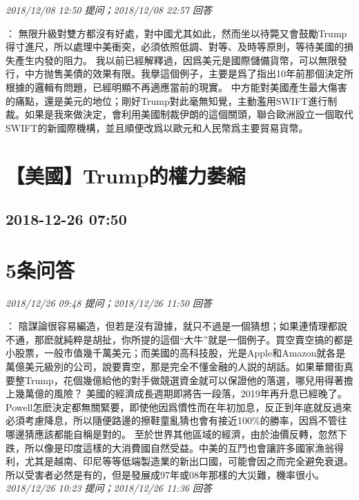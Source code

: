 \documentclass[twocolumn]{ctexart}
\begin{document}
\textit{\hfill\noindent\small 2018/12/08 12:50 提问；2018/12/08 22:57 回答}

：
無限升級對雙方都沒有好處，對中國尤其如此，然而坐以待斃又會鼓勵Trump得寸進尺，所以處理中美衝突，必須依照低調、對等、及時等原則，等待美國的損失產生内發的阻力。
我以前已經解釋過，因爲美元是國際儲備貨幣，可以無限發行，中方抛售美債的效果有限。我擧這個例子，主要是爲了指出10年前那個決定所根據的邏輯有問題，已經明顯不再適應當前的現實。
中方能對美國產生最大傷害的痛點，還是美元的地位；剛好Trump對此毫無知覺，主動濫用SWIFT進行制裁。如果是我來做決定，會利用美國制裁伊朗的這個關頭，聯合歐洲設立一個取代SWIFT的新國際機構，並且順便改爲以歐元和人民幣爲主要貿易貨幣。
\\


\section{【美國】Trump的權力萎縮}
\subsection{2018-12-26 07:50}


\section{5条问答}

\textit{\hfill\noindent\small 2018/12/26 09:48 提问；2018/12/26 11:50 回答}

：
陰謀論很容易編造，但若是沒有證據，就只不過是一個猜想；如果連情理都說不通，那麽就純粹是胡扯，你所提的這個“大牛”就是一個例子。買空賣空搞的都是小股票，一般市值幾千萬美元；而美國的高科技股，光是Apple和Amazon就各是萬億美元級別的公司，說要賣空，那是完全不懂金融的人説的胡話。如果華爾街真要整Trump，花個幾億給他的對手做競選資金就可以保證他的落選，哪兒用得著擔上幾萬億的風險？ 
美國的經濟成長週期即將告一段落，2019年再升息已經晚了。 Powell怎麽決定都無關緊要，即使他因爲慣性而在年初加息，反正到年底就反過來必須考慮降息，所以隨便路邊的擦鞋童亂猜也會有接近100\%的勝率，因爲不管往哪邊猜應該都能自稱是對的。 
至於世界其他區域的經濟，由於油價反轉，忽然下跌，所以像是印度這樣的大消費國自然受益。中美的互鬥也會讓許多國家漁翁得利，尤其是越南、印尼等等低端製造業的新出口國，可能會因之而完全避免衰退。所以受害者必然是有的，但是發展成97年或08年那樣的大災難，機率很小。
\\

\textit{\hfill\noindent\small 2018/12/26 10:23 提问；2018/12/26 11:36 回答}
\end{document}
